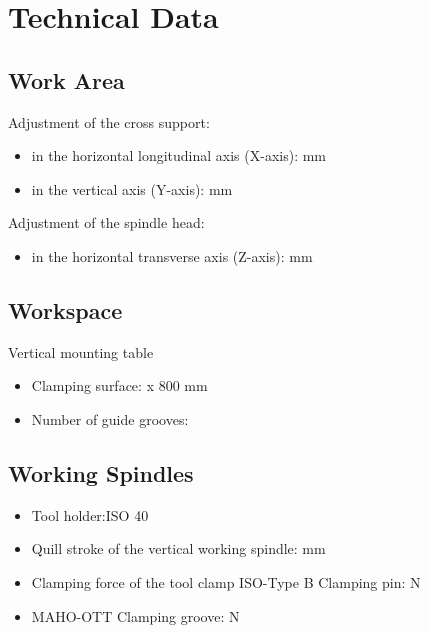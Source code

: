 
\section{Technical Data}

\subsection{Work Area}
Adjustment of the cross support:
\begin{itemize}
    \item in the horizontal longitudinal axis (X-axis):  mm
    \item in the vertical axis (Y-axis):  mm
\end{itemize}

Adjustment of the spindle head:
\begin{itemize}
    \item in the horizontal transverse axis (Z-axis):  mm
\end{itemize}

\subsection{Workspace}
Vertical mounting table \footnotemark[4]
\begin{itemize}
    \item Clamping surface:  x 800 mm
    \item Number of guide grooves: 
\end{itemize}


\subsection{Working Spindles}
\begin{itemize}
    \item Tool holder:\footnotemark[5] \dotfill ISO 40
    \item Quill stroke of the vertical working spindle:  mm
    \item Clamping force of the tool clamp ISO-Type B Clamping pin: \dotfill N \footnotemark[6]
    \item MAHO-OTT Clamping groove: \dotfill N \footnotemark[6]
\end{itemize}

